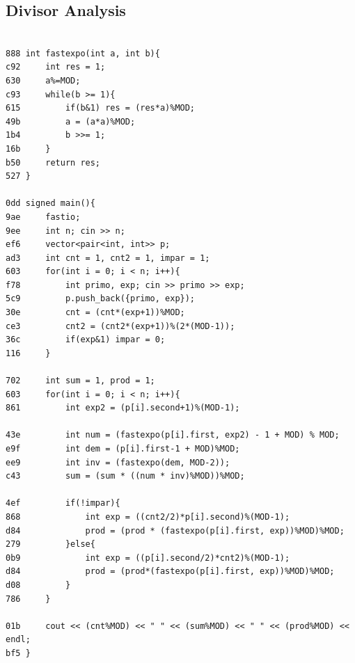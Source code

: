 \documentclass[11pt, a4paper, twoside]{article}
\begin{document}
\subsection{Divisor Analysis}
\begin{lstlisting}
 
888 int fastexpo(int a, int b){
c92     int res = 1;
630     a%=MOD;
c93     while(b >= 1){
615         if(b&1) res = (res*a)%MOD;
49b         a = (a*a)%MOD;
1b4         b >>= 1;
16b     }
b50     return res;
527 }
 
0dd signed main(){
9ae 	fastio;
9ee 	int n; cin >> n;
ef6     vector<pair<int, int>> p;
ad3     int cnt = 1, cnt2 = 1, impar = 1;
603     for(int i = 0; i < n; i++){
f78         int primo, exp; cin >> primo >> exp;
5c9         p.push_back({primo, exp});
30e         cnt = (cnt*(exp+1))%MOD;
ce3         cnt2 = (cnt2*(exp+1))%(2*(MOD-1));
36c         if(exp&1) impar = 0;
116     }
     
702     int sum = 1, prod = 1;
603     for(int i = 0; i < n; i++){
861         int exp2 = (p[i].second+1)%(MOD-1);
     
43e         int num = (fastexpo(p[i].first, exp2) - 1 + MOD) % MOD;
e9f         int dem = (p[i].first-1 + MOD)%MOD;
ee9         int inv = (fastexpo(dem, MOD-2));
c43         sum = (sum * ((num * inv)%MOD))%MOD;
     
4ef         if(!impar){
868             int exp = ((cnt2/2)*p[i].second)%(MOD-1);
d84             prod = (prod * (fastexpo(p[i].first, exp))%MOD)%MOD;
279         }else{
0b9             int exp = ((p[i].second/2)*cnt2)%(MOD-1);
d84             prod = (prod*(fastexpo(p[i].first, exp))%MOD)%MOD;
d08         }
786     }
     
01b     cout << (cnt%MOD) << " " << (sum%MOD) << " " << (prod%MOD) << endl;
bf5 }
\end{lstlisting}
\end{document}
